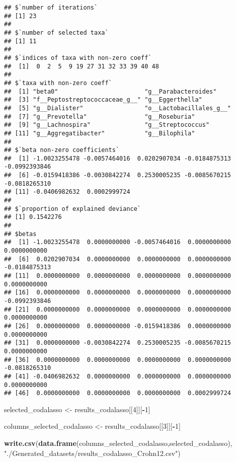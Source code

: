 \documentclass[]{book}
\newenvironment{Shaded}{\begin{snugshade}}{\end{snugshade}}
\newcommand{\KeywordTok}[1]{\textcolor[rgb]{0.13,0.29,0.53}{\textbf{#1}}}
\newcommand{\DecValTok}[1]{\textcolor[rgb]{0.00,0.00,0.81}{#1}}
\newcommand{\StringTok}[1]{\textcolor[rgb]{0.31,0.60,0.02}{#1}}
\newcommand{\OperatorTok}[1]{\textcolor[rgb]{0.81,0.36,0.00}{\textbf{#1}}}
\newcommand{\NormalTok}[1]{#1}
\begin{document}
\begin{verbatim}
## $`number of iterations`
## [1] 23
## 
## $`number of selected taxa`
## [1] 11
## 
## $`indices of taxa with non-zero coeff`
##  [1]  0  2  5  9 19 27 31 32 33 39 40 48
## 
## $`taxa with non-zero coeff`
##  [1] "beta0"                        "g__Parabacteroides"          
##  [3] "f__Peptostreptococcaceae_g__" "g__Eggerthella"              
##  [5] "g__Dialister"                 "o__Lactobacillales_g__"      
##  [7] "g__Prevotella"                "g__Roseburia"                
##  [9] "g__Lachnospira"               "g__Streptococcus"            
## [11] "g__Aggregatibacter"           "g__Bilophila"                
## 
## $`beta non-zero coefficients`
##  [1] -1.0023255478 -0.0057464016  0.0202907034 -0.0184875313 -0.0992393846
##  [6] -0.0159418386 -0.0030842274  0.2530005235 -0.0085670215 -0.0818265310
## [11] -0.0406982632  0.0002999724
## 
## $`proportion of explained deviance`
## [1] 0.1542276
## 
## $betas
##  [1] -1.0023255478  0.0000000000 -0.0057464016  0.0000000000  0.0000000000
##  [6]  0.0202907034  0.0000000000  0.0000000000  0.0000000000 -0.0184875313
## [11]  0.0000000000  0.0000000000  0.0000000000  0.0000000000  0.0000000000
## [16]  0.0000000000  0.0000000000  0.0000000000  0.0000000000 -0.0992393846
## [21]  0.0000000000  0.0000000000  0.0000000000  0.0000000000  0.0000000000
## [26]  0.0000000000  0.0000000000 -0.0159418386  0.0000000000  0.0000000000
## [31]  0.0000000000 -0.0030842274  0.2530005235 -0.0085670215  0.0000000000
## [36]  0.0000000000  0.0000000000  0.0000000000  0.0000000000 -0.0818265310
## [41] -0.0406982632  0.0000000000  0.0000000000  0.0000000000  0.0000000000
## [46]  0.0000000000  0.0000000000  0.0000000000  0.0002999724
\end{verbatim}

\begin{Shaded}
\begin{Highlighting}[]
\NormalTok{selected_codalasso <-}\StringTok{ }\NormalTok{results_codalasso[[}\DecValTok{4}\NormalTok{]][}\OperatorTok{-}\DecValTok{1}\NormalTok{]}

\NormalTok{columns_selected_codalasso <-}\StringTok{ }\NormalTok{results_codalasso[[}\DecValTok{3}\NormalTok{]][}\OperatorTok{-}\DecValTok{1}\NormalTok{]}

\KeywordTok{write.csv}\NormalTok{(}\KeywordTok{data.frame}\NormalTok{(columns_selected_codalasso,selected_codalasso),}
          \StringTok{"./Generated_datasets/results_codalasso_Crohn12.csv"}\NormalTok{)}
\end{Highlighting}
\end{Shaded}
\end{document}
